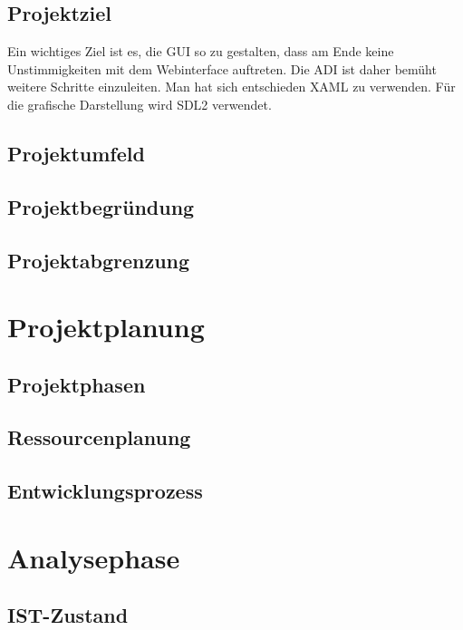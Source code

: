 \documentclass[11pt,toc=sectionentrywithoutdots, headheight=44pt, headings=optiontoheadandtoc]{scrartcl}
\begin{document}
\subsection{Projektziel}
Ein wichtiges Ziel ist es, die \acs{GUI} so zu gestalten, dass am Ende keine Unstimmigkeiten mit dem 
Webinterface auftreten. Die \acs{ADI} ist daher bemüht weitere Schritte einzuleiten. Man hat sich entschieden \acs{XAML} zu verwenden. Für die grafische Darstellung wird \acs{SDL2} verwendet.

\subsection{Projektumfeld}
\blindtext

\subsection{Projektbegründung}
\blindtext

\subsection{Projektabgrenzung}
\blindtext

\section{Projektplanung}
\blindtext

\subsection{Projektphasen}
\blindtext

\subsection{Ressourcenplanung}
\blindtext

\subsection{Entwicklungsprozess}
\blindtext

\section{Analysephase}
\blindtext

\subsection{IST-Zustand}
\blindtext
\end{document}
